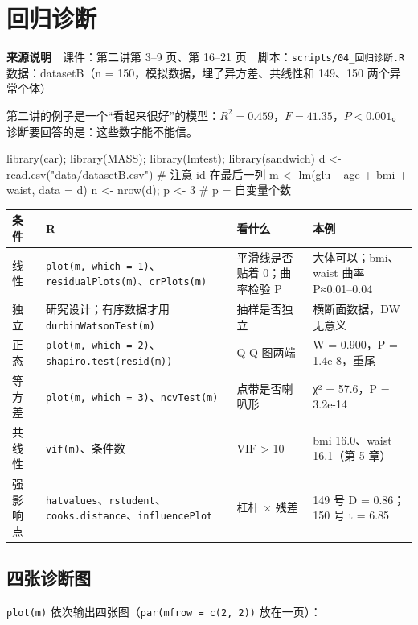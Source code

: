 \chapter{回归诊断}

\begin{studysource}
\textbf{来源说明}　课件：第二讲第 3–9 页、第 16–21 页　脚本：\texttt{scripts/04\_回归诊断.R}　数据：datasetB（n = 150，模拟数据，埋了异方差、共线性和 149、150 两个异常个体）
\end{studysource}


第二讲的例子是一个“看起来很好”的模型：$R^2=0.459$，$F=41.35$，$P<0.001$。诊断要回答的是：这些数字能不能信。

\begin{rcode}[R · 模型]
library(car); library(MASS); library(lmtest); library(sandwich)
d <- read.csv("data/datasetB.csv")          # 注意 id 在最后一列
m <- lm(glu ~ age + bmi + waist, data = d)
n <- nrow(d); p <- 3                        # p = 自变量个数
\end{rcode}


\begin{tabular}{p{1.7cm}p{4.6cm}p{3.6cm}p{4.4cm}}
\toprule
条件 & R & 看什么 & 本例\\
\midrule
线性 & \Verb|plot(m, which = 1)|、\Verb|residualPlots(m)|、\Verb|crPlots(m)| & 平滑线是否贴着 0；曲率检验 P & 大体可以；bmi、waist 曲率 P≈0.01–0.04\\
独立 & 研究设计；有序数据才用 \Verb|durbinWatsonTest(m)| & 抽样是否独立 & 横断面数据，DW 无意义\\
正态 & \Verb|plot(m, which = 2)|、\Verb|shapiro.test(resid(m))| & Q-Q 图两端 & W = 0.900，P = 1.4e-8，重尾\\
等方差 & \Verb|plot(m, which = 3)|、\Verb|ncvTest(m)| & 点带是否喇叭形 & χ² = 57.6，P = 3.2e-14\\
共线性 & \Verb|vif(m)|、条件数 & VIF > 10 & bmi 16.0、waist 16.1（第 5 章）\\
强影响点 & \Verb|hatvalues|、\Verb|rstudent|、\Verb|cooks.distance|、\Verb|influencePlot| & 杠杆 × 残差 & 149 号 D = 0.86；150 号 t = 6.85\\
\bottomrule
\end{tabular}


\section{四张诊断图}
\Verb|plot(m)| 依次输出四张图（\Verb|par(mfrow = c(2, 2))| 放在一页）：


